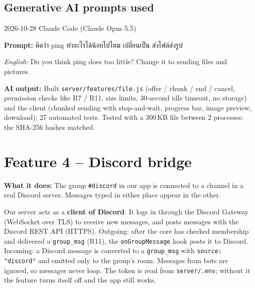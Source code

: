 \documentclass[11pt,a4paper]{article}
\newcommand{\code}[1]{\texttt{#1}}
\newcommand{\req}[1]{\begin{tcolorbox}[colback=accent!6,colframe=accent!60,boxrule=0.5pt,left=4pt,right=4pt,top=2pt,bottom=2pt]\textbf{What it does:} #1\end{tcolorbox}}
\newcommand{\promptbox}[4]{%
\begin{tcolorbox}[colback=codebg,colframe=gray!50,boxrule=0.4pt,left=4pt,right=4pt,top=2pt,bottom=2pt]
{\small #1 \quad Claude Code (Claude Opus 5.5)}\par
\textbf{Prompt:} #2\par
\textit{English:} #3\par
\textbf{AI output:} #4
\end{tcolorbox}}
\begin{document}
\subsection*{Generative AI prompts used}
\promptbox{2026-10-28}{คิดว่า ping ทำอะไรได้น้อยไปไหม \newline เปลี่ยนเป็น ส่งไฟล์ส่งรูป}{Do you think ping does too little? Change it to sending files and pictures.}{Built \code{server/features/file.js} (offer / chunk / end / cancel, permission checks like R7 / R11, size limits, 30-second idle timeout, no storage) and the client (chunked sending with stop-and-wait, progress bar, image preview, download); 27 automated tests. Tested with a 300\,KB file between 2 processes: the SHA-256 hashes matched.}

\clearpage
\section{Feature 4 -- Discord bridge}
\req{The group \code{\#discord} in our app is connected to a channel in a real Discord server.
Messages typed in either place appear in the other.}

Our server acts as a \textbf{client of Discord}. It logs in through the Discord Gateway
(WebSocket over TLS) to receive new messages, and posts messages with the Discord REST API (HTTPS).
Outgoing: after the core has checked membership and delivered a \code{group\_msg} (R11), the
\code{onGroupMessage} hook posts it to Discord. Incoming: a Discord message is converted to a
\code{group\_msg} with \code{source: "discord"} and emitted only to the group's room. Messages from bots are
ignored, so messages never loop. The token is read from \code{server/.env}; without it the feature turns
itself off and the app still works.
\end{document}
